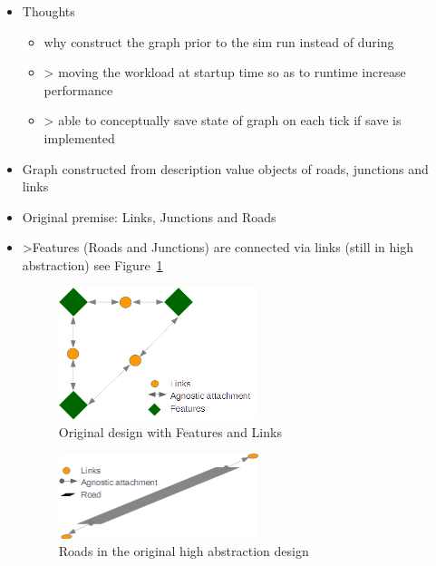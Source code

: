 \begin{itemize}
	\item Thoughts
    \begin{itemize}
        \item why construct the graph prior to the sim run instead of during
        \item > moving the workload at startup time so as to runtime increase performance
        \item > able to conceptually save state of graph on each tick if save is implemented
    \end{itemize}
    \item Graph constructed from description value objects of roads, junctions and links
    \item Original premise: Links, Junctions and Roads
    \item >Features (Roads and Junctions) are connected via links (still in high abstraction) see Figure~\ref{fig:FeatureConnect}

    \begin{figure}
        \vspace{1.5em}
        \caption{Original design with Features and Links}
        \label{fig:FeatureConnect}
        \centering
        \includegraphics[width=0.55\textwidth]{figs/graphConstruction/OriginalConnections.png}
        \vspace{1.5em}
    \end{figure}

    \begin{figure}
        \vspace{1.5em}
        \caption{Roads in the original high abstraction design}
        \label{fig:RoadsOriginal}
        \centering
        \includegraphics[width=0.55\textwidth]{figs/graphConstruction/OriginalRoads.png}
        \vspace{1.5em}
    \end{figure}


\end{itemize}
